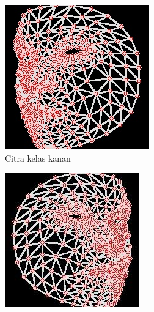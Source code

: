 \begin{figure}[H]
  \centering
  \begin{subfigure}{0.3\textwidth}
      \centering
      \includegraphics[width=\linewidth]{gambar/normal kanan.jpg}
      \caption{Citra kelas kanan}
      \label{fig:image1}
  \end{subfigure}
  \hfill
  \begin{subfigure}{0.3\textwidth}
      \centering
      \includegraphics[width=\linewidth]{gambar/normal kiri.jpg}

\end{subfigure}
\end{figure}
